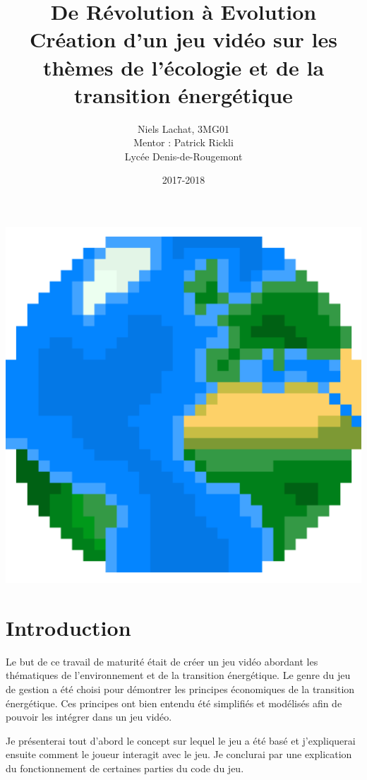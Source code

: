 \documentclass{article}
\title{De Révolution à Evolution \\ Création d'un jeu vidéo sur les thèmes de l'écologie et de la transition énergétique}
\date{2017-2018}
\author{Niels Lachat, 3MG01 \\ Mentor : Patrick Rickli \\ Lycée Denis-de-Rougemont}
\begin{document}
		

        \maketitle
        \vspace{24pt}
		\begin{center}
		        \includegraphics[scale=.3]{../images/logo}
		\end{center}        
        
        \newpage

        \tableofcontents
        \newpage

        \section{Introduction}
        Le but de ce travail de maturité était de créer un jeu vidéo abordant les thématiques de l'environnement et de la transition énergétique. 
        Le genre du jeu de gestion a été choisi pour démontrer les principes économiques de la transition énergétique.
        Ces principes ont bien entendu été simplifiés et modélisés afin de pouvoir les intégrer dans un jeu vidéo.
        
        
        Je présenterai tout d'abord le concept sur lequel le jeu a été basé et j'expliquerai ensuite comment le joueur interagit avec le jeu.
        Je conclurai par une explication du fonctionnement de certaines parties du code du jeu.
\end{document}
